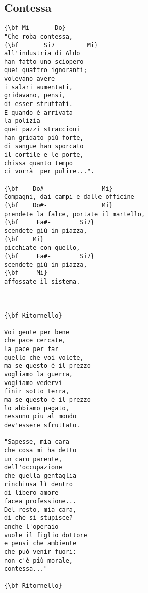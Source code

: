 \documentclass[a4paper]{article}
\begin{document}
\subsection{Contessa} %
\label{sub:Contess}
\begin{multicols}{2}
\begin{Verbatim}[commandchars=\\\{\}]
{\bf Mi       Do}
"Che roba contessa,
{\bf       Si7         Mi}
all'industria di Aldo
han fatto uno sciopero
quei quattro ignoranti;
volevano avere
i salari aumentati,
gridavano, pensi,
di esser sfruttati.
E quando è arrivata
la polizia
quei pazzi straccioni
han gridato più forte,
di sangue han sporcato
il cortile e le porte,
chissa quanto tempo
ci vorrà  per pulire...".

{\bf    Do#-               Mi}
Compagni, dai campi e dalle officine
{\bf    Do#-               Mi}
prendete la falce, portate il martello,
{\bf     Fa#-        Si7}
scendete giù in piazza,
{\bf    Mi}
picchiate con quello,
{\bf     Fa#-        Si7}
scendete giù in piazza,
{\bf     Mi}
affossate il sistema.



{\bf Ritornello}

Voi gente per bene
che pace cercate,
la pace per far
quello che voi volete,
ma se questo è il prezzo
vogliamo la guerra,
vogliamo vedervi
finir sotto terra,
ma se questo è il prezzo
lo abbiamo pagato,
nessuno piu al mondo
dev'essere sfruttato.

"Sapesse, mia cara
che cosa mi ha detto
un caro parente,
dell'occupazione
che quella gentaglia
rinchiusa lì dentro
di libero amore
facea professione...
Del resto, mia cara,
di che si stupisce?
anche l'operaio
vuole il figlio dottore
e pensi che ambiente
che può venir fuori:
non c'è più morale,
contessa..."

{\bf Ritornello}
\end{Verbatim}
\end{multicols}
\newpage
\end{document}
